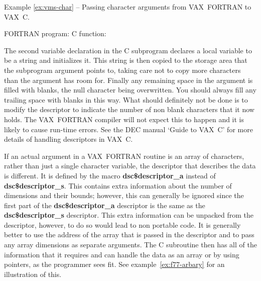 \label{ex:vms-char}
\begin{center}
Example \ref{ex:vms-char} -- Passing character arguments from VAX~FORTRAN to VAX~C.
\end{center}
\nopagebreak[4]
FORTRAN program:
\pagebreak[1]
C function:

The second variable declaration in the C subprogram declares a local variable
to be a string and initializes it. This string is then copied to the storage
area that the subprogram argument points to, taking care not to copy more
characters than the argument has room for. Finally any remaining space in the
argument is filled with blanks, the null character being overwritten. You
should always fill any trailing space with blanks in this way. What should
definitely not be done is to modify the descriptor to indicate the number of
non blank characters that it now holds. The VAX~FORTRAN compiler will not
expect this to happen and it is likely to cause run-time errors. See the DEC
manual `Guide to VAX~C' for more details of handling descriptors in VAX~C.

If an actual argument in a VAX~FORTRAN routine is an array of characters, rather
than just a single character variable, the descriptor that describes the data
is different. It is defined by the macro {\bf dsc\$descriptor\_a} instead of
{\bf dsc\$descriptor\_s}. This contains extra information about the number of
dimensions and their bounds; however, this can generally be ignored since the
first part of the {\bf dsc\$descriptor\_a} descriptor is the same as the {\bf
dsc\$descriptor\_s} descriptor. This extra information can be unpacked from the
descriptor, however, to do so would lead to non portable code. It is generally
better to use the address of the array that is passed in the descriptor and to
pass any array dimensions as separate arguments. The C subroutine then has all
of the information that it requires and can handle the data as an array or by
using pointers, as the programmer sees fit. See example~\ref{ex:f77-arbary} for
an illustration of this.

